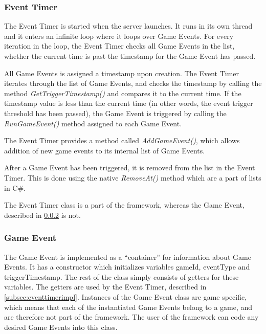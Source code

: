 \subsubsection{Event Timer}
\label{sec:eventtimerimpl}
The Event Timer is started when the server launches. It runs in its own thread and it enters an infinite loop where it loops over Game Events. For every iteration in the loop, the Event Timer checks all Game Events in the list, whether the current time is past the timestamp for the Game Event has passed. 

All Game Events is assigned a timestamp upon creation. The Event Timer iterates through the list of Game Events, and checks the timestamp by calling the method \textit{GetTriggerTimestamp()} and compares it to the current time. If the timestamp value is less than the current time (in other words, the event trigger threshold has been passed), the Game Event is triggered by calling the \textit{RunGameEvent()} method assigned to each Game Event. 

The Event Timer provides a method called \textit{AddGameEvent()}, which allows addition of new game events to its internal list of Game Events.

After a Game Event has been triggered, it is removed from the list in the Event Timer. This is done using the native \textit{RemoveAt()} method which are a part of lists in C\#.

The Event Timer class is a part of the framework, whereas the Game Event, described in \cref{subsec:geventImpl} is not.

\subsubsection{Game Event}\label{subsec:geventImpl}
The Game Event is implemented as a ``container'' for information about Game Events. It has a constructor which initializes variables gameId, eventType and triggerTimestamp. The rest of the class simply consists of getters for these variables. The getters are used by the Event Timer, described in \cref{subsec:eventtimerimpl}. Instances of the Game Event class are game specific, which means that each of the instantiated Game Events belong to a game, and are therefore not part of the framework. The user of the framework can code any desired Game Events into this class.